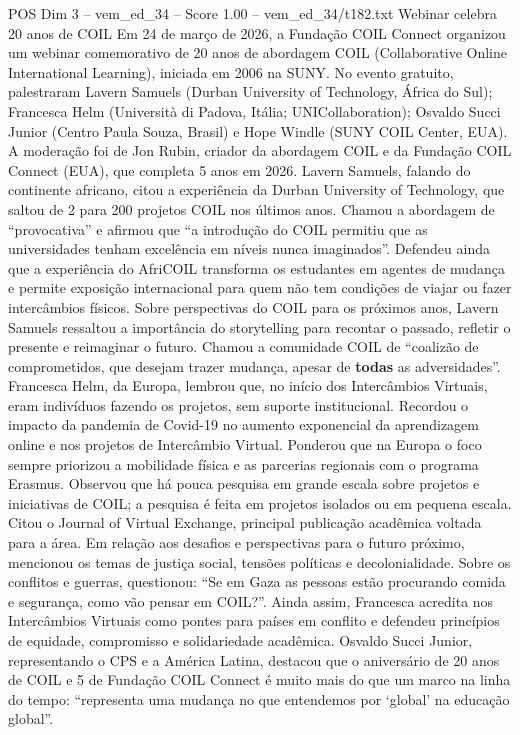 \begin{textsample}{POS Dim 3 – vem\_ed\_34 – Score 1.00 – vem\_ed\_34/t182.txt}  \label{ex:f3_pos_056}
Webinar celebra 20 anos de COIL Em 24 de março de 2026, a Fundação COIL Connect organizou um webinar comemorativo de 20 anos de abordagem COIL (Collaborative Online International Learning), iniciada em 2006 na SUNY.
No evento gratuito, palestraram Lavern Samuels (Durban University of Technology, África do Sul); Francesca Helm (Università di Padova, Itália; UNICollaboration); Osvaldo Succi Junior (Centro Paula Souza, Brasil) e Hope Windle (SUNY COIL Center, EUA).
A moderação foi de Jon Rubin, criador da abordagem COIL e da Fundação COIL Connect (EUA), que completa 5 anos em 2026.
Lavern Samuels, falando do continente africano, citou a experiência da Durban University of Technology, que saltou de 2 para 200 projetos COIL nos últimos anos.
Chamou a abordagem de “provocativa” e afirmou que “a introdução do COIL permitiu que as universidades tenham excelência em níveis nunca imaginados”.
Defendeu ainda que a experiência do AfriCOIL transforma os estudantes em agentes de mudança e permite exposição internacional para quem não tem condições de viajar ou fazer intercâmbios físicos.
Sobre perspectivas do COIL para os próximos anos, Lavern Samuels ressaltou a importância do storytelling para recontar o passado, refletir o presente e reimaginar o futuro.
Chamou a comunidade COIL de “coalizão de comprometidos, que desejam trazer mudança, apesar de \textbf{todas} as adversidades”.
Francesca Helm, da Europa, lembrou que, no início dos Intercâmbios Virtuais, eram indivíduos fazendo os projetos, sem suporte institucional.
Recordou o impacto da pandemia de Covid-19 no aumento exponencial da aprendizagem online e nos projetos de Intercâmbio Virtual.
Ponderou que na Europa o foco sempre priorizou a mobilidade física e as parcerias regionais com o programa Erasmus.
Observou que há pouca pesquisa em grande escala sobre projetos e iniciativas de COIL; a pesquisa é feita em projetos isolados ou em pequena escala.
Citou o Journal of Virtual Exchange, principal publicação acadêmica voltada para a área.
Em relação aos desafios e perspectivas para o futuro próximo, mencionou os temas de justiça social, tensões políticas e decolonialidade.
Sobre os conflitos e guerras, questionou: “Se em Gaza as pessoas estão procurando comida e segurança, como vão pensar em COIL?”.
Ainda assim, Francesca acredita nos Intercâmbios Virtuais como pontes para países em conflito e defendeu princípios de equidade, compromisso e solidariedade acadêmica.
Osvaldo Succi Junior, representando o CPS e a América Latina, destacou que o aniversário de 20 anos de COIL e 5 de Fundação COIL Connect é muito mais do que um marco na linha do tempo: “representa uma mudança no que entendemos por ‘global’ na educação global”.

\end{textsample}
